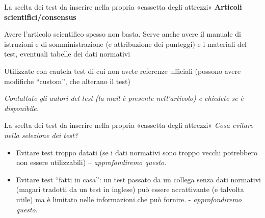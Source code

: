 \documentclass[
  ignorenonframetext,
]{beamer}
\begin{document}
\begin{frame}{La scelta dei test da inserire nella propria «cassetta
degli attrezzi»}
\label{la-scelta-dei-test-da-inserire-nella-propria-cassetta-degli-attrezzi-3}
\textbf{Articoli scientifici/consensus}

Avere l'articolo scientifico spesso non basta. Serve anche avere il
manuale di istruzioni e di somministrazione (e attribuzione dei
punteggi) e i materiali del test, eventuali tabelle dei dati normativi

Utilizzate con cautela test di cui non avete referenze ufficiali
(possono avere modifiche ``custom'', che alterano il test)

\emph{Contattate gli autori del test (la mail è presente nell'articolo)
e chiedete se è disponibile.}
\end{frame}

\begin{frame}{La scelta dei test da inserire nella propria «cassetta
degli attrezzi»}
\label{la-scelta-dei-test-da-inserire-nella-propria-cassetta-degli-attrezzi-4}
\emph{Cosa evitare nella selezione dei test?}

\begin{itemize}[<*>] 
  \item Evitare test troppo datati (se i dati normativi sono troppo vecchi potrebbero non essere utilizzabili) –     \emph{approfondiremo questo}.
  \item Evitare test “fatti in casa”: un test passato da un collega senza dati normativi (magari tradotti da un test in inglese) può essere accattivante (e talvolta utile) ma è limitato nelle informazioni che può fornire. - \emph{approfondiremo questo}.
\end{itemize}
\end{frame}
\end{document}
